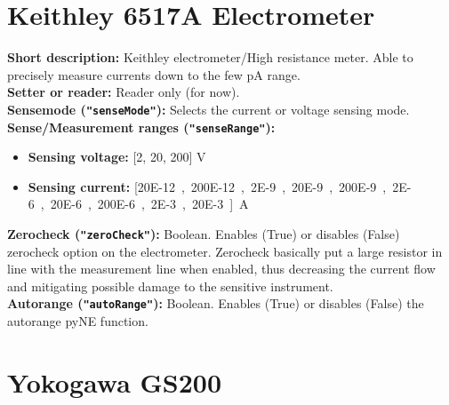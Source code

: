 \section{Keithley 6517A Electrometer }

\textbf{\textsf{Short description}:} Keithley electrometer/High resistance meter. Able to precisely measure currents down to the few pA range. \\
\textbf{\textsf{Setter or reader}:} Reader only (for now).\\
\textbf{\textsf{Sensemode} (\texttt{"senseMode"}):} Selects the current or voltage sensing mode.\\
\textbf{\textsf{Sense/Measurement ranges} (\texttt{"senseRange"}):}
\begin{itemize}[noitemsep]
\item \textbf{\textsf{Sensing voltage:}} [2, 20, 200] V\\
\item \textbf{\textsf{Sensing current:}} [\SI{20E-12}, \SI{200E-12}, \SI{2E-9}, \SI{20E-9}, \SI{200E-9}, \SI{2E-6}, \SI{20E-6}, \SI{200E-6}, \SI{2E-3}, \SI{20E-3}] A
\end{itemize}
\textbf{\textsf{Zerocheck} (\texttt{"zeroCheck"}):} Boolean. Enables (True) or disables (False) zerocheck option on the electrometer. Zerocheck basically put a large resistor in line with the measurement line when enabled, thus decreasing the current flow and mitigating possible damage to the sensitive instrument.\\
\textbf{\textsf{Autorange} (\texttt{"autoRange"}):} Boolean. Enables (True) or disables (False) the autorange pyNE function.\\

\section{Yokogawa GS200}

